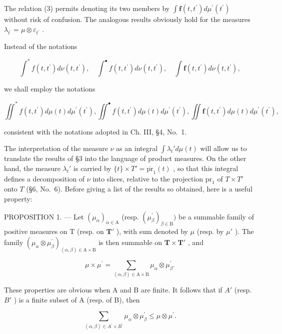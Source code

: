 The relation (3) permits denoting its two members by \(\int\mathbf{f}(t,t^{\prime})d\mu^{\prime}(t^{\prime})\) without risk of confusion. The analogous results obviously hold for the measures \(\lambda_{t^{\prime}}=\mu\otimes\varepsilon_{t^{\prime}}\) .

Instead of the notations

\[
\int^ {*} f (t, t ^ {\prime}) d \nu (t, t ^ {\prime}), \quad \int^ {\bullet} f (t, t ^ {\prime}) d \nu (t, t ^ {\prime}), \quad \int \mathbf {f} (t, t ^ {\prime}) d \nu (t, t ^ {\prime}),
\]

we shall employ the notations

\[
\iint^ {*} f (t, t ^ {\prime}) d \mu (t) d \mu^ {\prime} (t ^ {\prime}), \iint^ {\bullet} f (t, t ^ {\prime}) d \mu (t) d \mu^ {\prime} (t ^ {\prime}), \iint \mathbf {f} (t, t ^ {\prime}) d \mu (t) d \mu^ {\prime} (t ^ {\prime}),
\]

consistent with the notations adopted in Ch. III, §4, No.~1.

The interpretation of the measure \(\nu\) as an integral \(\int \lambda_t' d\mu(t)\) will allow us to translate the results of §3 into the language of product measures. On the other hand, the measure \(\lambda_t'\) is carried by \(\{t\} \times T' = \overline{\text{pr}}_1(t)\) , so that this integral defines a decomposition of \(\nu\) into slices, relative to the projection \(\text{pr}_1\) of \(T \times T'\) onto \(T\) (§6, No.~6). Before giving a list of the results so obtained, here is a useful property:

PROPOSITION 1. --- Let \((\mu_{\alpha})_{\alpha \in \mathrm{A}}\) (resp. \((\mu_{\beta}^{\prime})_{\beta \in \mathrm{B}})\) be a summable family of positive measures on T (resp. on \(\mathbf{T}'\) ), with sum denoted by \(\mu\) (resp. by \(\mu'\) ). The family \((\mu_{\alpha} \otimes \mu_{\beta}^{\prime})_{(\alpha, \beta) \in \mathrm{A} \times \mathrm{B}}\) is then summable on \(\mathbf{T} \times \mathbf{T}'\) , and

\[
\mu \times \mu^ {\prime} = \sum_ {(\alpha , \beta) \in \mathrm{A} \times \mathrm{B}} \mu_ {\alpha} \otimes \mu_ {\beta} ^ {\prime}.\tag{4}
\]

These properties are obvious when A and B are finite. It follows that if \(A'\) (resp. \(B'\) ) is a finite subset of A (resp. of B), then

\[
\sum_ {(\alpha , \beta) \in A ^ {\prime} \times B ^ {\prime}} \mu_ {\alpha} \otimes \mu_ {\beta} ^ {\prime} \leqslant \mu \otimes \mu^ {\prime}.
\]

